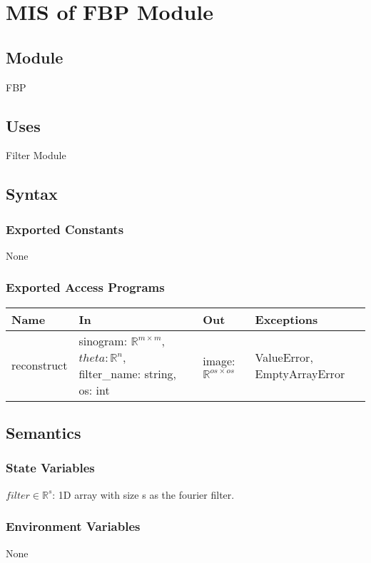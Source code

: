 \documentclass[12pt, titlepage]{article}
\begin{document}
\section{MIS of FBP Module} \label{ModuleFBP}

\subsection{Module}
FBP

\subsection{Uses}
Filter Module

\subsection{Syntax}

\subsubsection{Exported Constants}
None

\subsubsection{Exported Access Programs}

\begin{center}
  \begin{tabular}{|l|m{18em}|l|m{11em}|}
\hline
\textbf{Name} & \textbf{In} & \textbf{Out} & \textbf{Exceptions} \\
\hline
reconstruct & sinogram: \(\mathbb{R}^{m \times m}\), \(theta: \mathbb{R}^{n}\), filter\_name: string, os: int & image: \(\mathbb{R}^{os \times os}\)& ValueError, EmptyArrayError\\
\hline
\end{tabular}
\end{center}

\subsection{Semantics}

\subsubsection{State Variables}
\(filter \in \mathbb{R}^{s}\): 1D array with size s as the fourier filter.

\subsubsection{Environment Variables}
None
\end{document}
